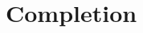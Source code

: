 \documentclass[../main.tex]{subfiles}
\begin{document}



%
%
%
\section{Completion}
\end{document}
